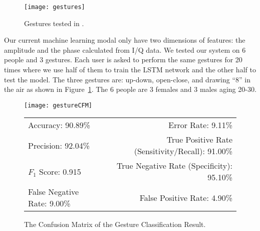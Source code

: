 \begin{figure}[h]
	\centering
	\begin{minipage}{.6\linewidth}
		\texttt{[image: gestures]}
	\end{minipage}
	\caption{Gestures tested in {\uu}.}	
	\label{fig:gestures}
\end{figure}


Our current machine learning modal only have two dimensions of features: the amplitude and the phase calculated from I/Q data. We tested our {\uu} system on 6 people and 3 gestures. Each user is asked to perform the same gestures for 20 times where we use half of them to train the LSTM network and the other half to test the model. The three gestures are: up-down, open-close, and drawing ``8'' in the air as shown in Figure~\ref{fig:gestures}. The 6 people are 3 females and 3 males aging 20-30. 


\begin{figure}[!h]
	\centering
	\begin{minipage}{.35\linewidth}
		\texttt{[image: gestureCFM]}
		\vspace{.05in}
	\end{minipage}
	
	\centering
	\begin{tabular}{lr}
		\toprule
		Accuracy: 90.89\% & \hspace{-.55in} Error Rate: 9.11\% \\
		Precision: 92.04\% & \hspace{-.55in} True Positive Rate (Sensitivity/Recall): 91.00\% \\
		$F_1$ Score: 0.915 & \hspace{-.55in} True Negative Rate (Specificity): 95.10\% \\
		False Negative Rate: 9.00\%  & \hspace{-.55in} False Positive Rate: 4.90\% \\
		\bottomrule
	\end{tabular}
	\caption{The Confusion Matrix of the Gesture Classification Result.
	}
	\label{fig:gestureCFM}
\end{figure}

